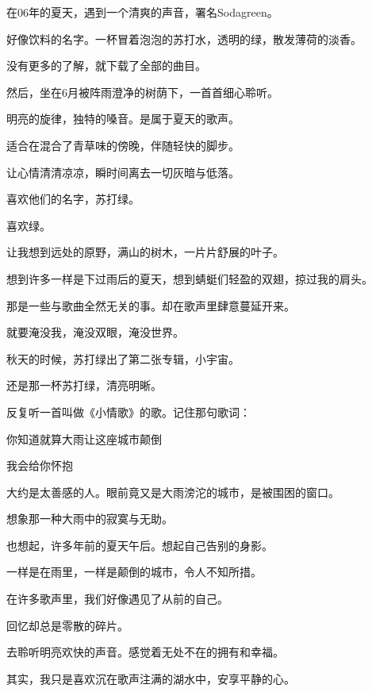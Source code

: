 
		在06年的夏天，遇到一个清爽的声音，署名Sodagreen。\par
		好像饮料的名字。一杯冒着泡泡的苏打水，透明的绿，散发薄荷的淡香。\par
		没有更多的了解，就下载了全部的曲目。\par
		然后，坐在6月被阵雨澄净的树荫下，一首首细心聆听。\par
		明亮的旋律，独特的嗓音。是属于夏天的歌声。\par
		适合在混合了青草味的傍晚，伴随轻快的脚步。\par
		让心情清清凉凉，瞬时间离去一切灰暗与低落。

		\vspace{1em}
		喜欢他们的名字，苏打绿。\par
		喜欢绿。\par
		让我想到远处的原野，满山的树木，一片片舒展的叶子。\par
		想到许多一样是下过雨后的夏天，想到蜻蜓们轻盈的双翅，掠过我的肩头。\par
		那是一些与歌曲全然无关的事。却在歌声里肆意蔓延开来。\par
		就要淹没我，淹没双眼，淹没世界。

		\vspace{1em}
		秋天的时候，苏打绿出了第二张专辑，小宇宙。\par
		还是那一杯苏打绿，清亮明晰。\par
		反复听一首叫做《小情歌》的歌。记住那句歌词：

		你知道就算大雨让这座城市颠倒

		我会给你怀抱

		\vspace{1em}
		大约是太善感的人。眼前竟又是大雨滂沱的城市，是被围困的窗口。\par
		想象那一种大雨中的寂寞与无助。\par
		也想起，许多年前的夏天午后。想起自己告别的身影。\par
		一样是在雨里，一样是颠倒的城市，令人不知所措。\par
		在许多歌声里，我们好像遇见了从前的自己。\par
		回忆却总是零散的碎片。

		去聆听明亮欢快的声音。感觉着无处不在的拥有和幸福。

		其实，我只是喜欢沉在歌声注满的湖水中，安享平静的心。

	\endwriting



